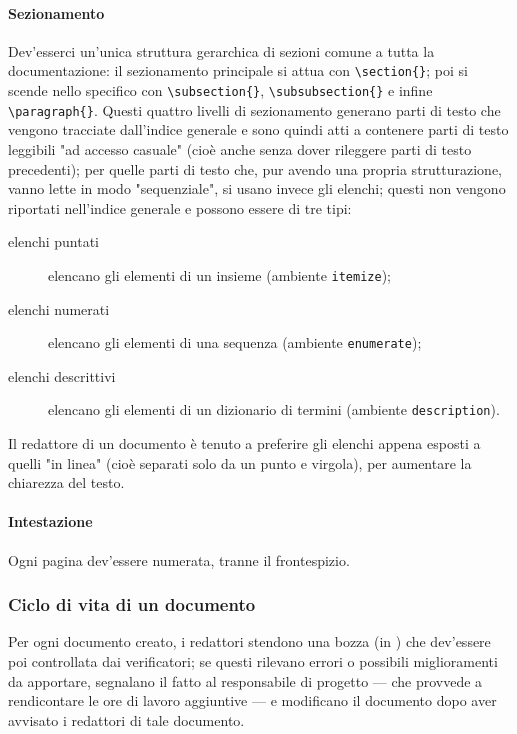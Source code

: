 \paragraph{Sezionamento} Dev'esserci un'unica struttura gerarchica di sezioni comune a tutta la documentazione: il sezionamento principale si attua con \texttt{\textbackslash section\{\}}; poi si scende nello specifico con \texttt{\textbackslash subsection\{\}}, \texttt{\textbackslash subsubsection\{\}} e infine \texttt{\textbackslash paragraph\{\}}. Questi quattro livelli di sezionamento generano parti di testo che vengono tracciate dall'indice generale e sono quindi atti a contenere parti di testo leggibili "ad accesso casuale" (cioè anche senza dover rileggere parti di testo precedenti); per quelle parti di testo che, pur avendo una propria strutturazione, vanno lette in modo "sequenziale", si usano invece gli elenchi; questi non vengono riportati nell'indice generale e possono essere di tre tipi:
\begin{description}
	\item[elenchi puntati] elencano gli elementi di un insieme (ambiente \texttt{itemize});
	\item[elenchi numerati] elencano gli elementi di una sequenza (ambiente \texttt{enumerate});
	\item[elenchi descrittivi] elencano gli elementi di un dizionario di termini (ambiente \texttt{description}).
\end{description}
Il redattore di un documento è tenuto a preferire gli elenchi appena esposti a quelli "in linea" (cioè separati solo da un punto e virgola), per aumentare la chiarezza del testo.
\paragraph{Intestazione} Ogni pagina dev'essere numerata, tranne il frontespizio. %

\subsubsection{Ciclo di vita di un documento} Per ogni documento creato, i redattori stendono una bozza (in ) che dev'essere poi controllata dai verificatori; se questi rilevano errori o possibili miglioramenti da apportare, segnalano il fatto al responsabile di progetto --- che provvede a rendicontare le ore di lavoro aggiuntive --- e modificano il documento dopo aver avvisato i redattori di tale documento.

